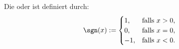 Die  oder  ist definiert durch:
$$
\sgn(x) := 
\begin{cases}
    1, & \text{falls} \ x > 0, \\
    0, & \text{falls} \ x = 0, \\
    -1, & \text{falls} \ x < 0. \\
\end{cases}
$$